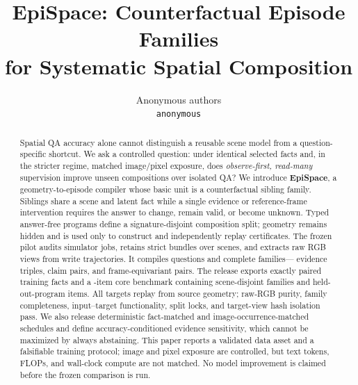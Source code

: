 \documentclass{article}
\title{EpiSpace: Counterfactual Episode Families\\
for Systematic Spatial Composition}
\author{Anonymous authors\\
\texttt{anonymous}}
\begin{document}

\maketitle

\begin{abstract}
Spatial QA accuracy alone cannot distinguish a reusable scene model from a
question-specific shortcut.  We ask a controlled question: under identical
selected facts and, in the stricter regime, matched image/pixel exposure, does
\emph{observe-first, read-many}
supervision improve unseen compositions over isolated QA?  We introduce
\textbf{EpiSpace}, a geometry-to-episode compiler whose basic unit is a
counterfactual sibling family.  Siblings share a scene and latent fact while a
single evidence or reference-frame intervention requires the answer to change,
remain valid, or become unknown.  Typed answer-free programs define a
signature-disjoint composition split; geometry remains hidden and is used only
to construct and independently replay certificates.  The frozen pilot audits
\EpiPlannedJobs{} simulator jobs, retains \EpiStrictBundles{} strict bundles
over \EpiScenes{} scenes, and extracts \EpiSourceViews{} raw RGB views from
\EpiSourceTrajectories{} write trajectories.  It compiles
\EpiCompiledQuestions{} questions and \EpiConsistencyFamilies{} complete
families---\EpiEvidenceFamilies{} evidence triples, \EpiClaimFamilies{} claim
pairs, and \EpiFrameFamilies{} frame-equivariant pairs.  The release exports
\EpiSupervisedFacts{} exactly paired training facts and a
\EpiCoreBenchmarkRecords{}-item core benchmark containing
\EpiFamilyBenchmarkGroups{} scene-disjoint families and
\EpiCompositionRecords{} held-out-program items.  All
\EpiReplayedCertificates{} targets replay from source geometry; raw-RGB purity,
family completeness, input--target functionality, split locks, and target-view
hash isolation pass.  We also release deterministic fact-matched and
image-occurrence-matched schedules and define accuracy-conditioned evidence
sensitivity, which cannot be maximized by always abstaining.  This paper
reports a validated data asset and a falsifiable training protocol; image and
pixel exposure are controlled, but text tokens, FLOPs, and wall-clock compute
are not matched.  No model improvement is claimed before the frozen comparison
is run.
\end{abstract}












\appendix

\end{document}
